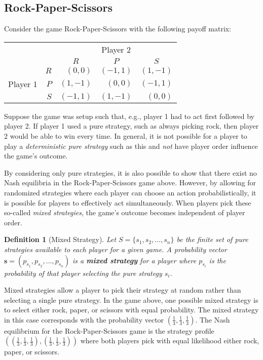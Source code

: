 \documentclass[twoside]{article}
\newtheorem{definition}[theorem]{Definition}
\begin{document}
\subsection{Rock-Paper-Scissors}
Consider the game Rock-Paper-Scissors with the following payoff matrix:

\begin{table}[ht]
\centering
\renewcommand{\arraystretch}{1.5}
\begin{tabular}{cr|r|r|r|}
& \multicolumn{1}{c}{} & \multicolumn{3}{c}{Player 2} \\
& \multicolumn{1}{c}{} & \multicolumn{1}{c}{$R$} & \multicolumn{1}{c}{$P$} & \multicolumn{1}{c}{$S$} \\ \cline{3-5}
& $R$ & $(0, 0)$ & $(-1, 1)$ & $(1, -1)$ \\ \cline{3-5}
\multicolumn{1}{c}{Player 1} & $P$ & $(1, -1)$ & $(0, 0)$ & $(-1, 1)$ \\ \cline{3-5}
& $S$ & $(-1, 1)$ & $(1, -1)$ & $(0, 0)$ \\ \cline{3-5}
\end{tabular}
\end{table}

Suppose the game was setup such that, e.g., player 1 had to act first followed by player 2. If player 1 used a pure strategy, such as always picking rock, then player 2 would be able to win every time. In general, it is not possible for a player to play a \textit{deterministic pure strategy} such as this and \textit{not} have player order influence the game's outcome.

By considering only pure strategies, it is also possible to show that there exist no Nash equilibria in the Rock-Paper-Scissors game above. However, by allowing for randomized strategies where each player can choose an action probabilistically, it is possible for players to effectively act simultaneously. When players pick these so-called \textit{mixed strategies}, the game's outcome becomes independent of player order.

\begin{definition}[Mixed Strategy]
Let $S = \{s_1, s_2, \ldots, s_n\}$ be the finite set of pure strategies available to each player for a given game. A probability vector $\mathbf{s}=(p_{s_1}, p_{s_2}, \ldots, p_{s_n})$ is a \textbf{mixed strategy} for a player where $p_{s_i}$ is the probability of that player selecting the pure strategy $s_i$.
\end{definition}

Mixed strategies allow a player to pick their strategy at random rather than selecting a single pure strategy. In the game above, one possible mixed strategy is to select either rock, paper, or scissors with equal probability. The mixed strategy in this case corresponds with the probability vector $\left(\frac{1}{3},\frac{1}{3},\frac{1}{3}\right)$. The Nash equilibrium for the Rock-Paper-Scissors game is the strategy profile $\left(\left(\frac{1}{3},\frac{1}{3},\frac{1}{3}\right), \left(\frac{1}{3},\frac{1}{3},\frac{1}{3}\right)\right)$ where both players pick with equal likelihood either rock, paper, or scissors.
\end{document}
